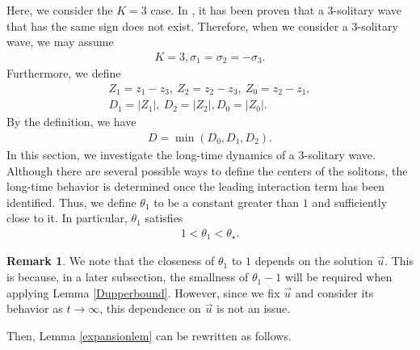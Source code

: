 \documentclass[reqno]{amsart}
\theoremstyle{plain}
\theoremstyle{definition}
\newtheorem{remark}{Remark}[section]
\numberwithin{equation}{section}
\newcommand{\1}{\mathbbm{1}}
\begin{document}
Here, we consider the $K=3$ case. In \cite{CD}, it has been proven that a 3-solitary wave that has the same sign does not exist. Therefore, when we consider a 3-solitary wave, we may assume
\begin{align}\label{3soliass}
K=3, \sigma_1=\sigma_2=-\sigma_3.
\end{align}
Furthermore, we define
\begin{align*}
Z_1=z_1-z_3,\ Z_2=z_2-z_3,\ Z_0=z_2-z_1,
\\
D_1=|Z_1|,\ D_2=|Z_2|, D_0=|Z_0|.
\end{align*}
By the definition, we have
\begin{align}\label{Ddef2}
D=\min{(D_0,D_1,D_2)}.
\end{align}
In this section, we investigate the long-time dynamics of a 3-solitary wave. Although there are several possible ways to define the centers of the solitons, the long-time behavior is determined once the leading interaction term has been identified. Thus, we define $\theta_1$ to be a constant greater than $1$ and sufficiently close to it. In particular, $\theta_1$ satisfies 
\begin{align}\label{theta1}
1<\theta_1<\theta_{\star}.
\end{align}
\begin{remark}
We note that the closeness of $\theta_1$ to $1$ depends on the solution $\vec{u}$. This is because, in a later subsection, the smallness of $\theta_1-1$ will be required when applying Lemma \ref{Dupperbound}. However, since we fix $\vec{u}$ and consider its behavior as $t\to\infty$, this dependence on $\vec{u}$ is not an issue.
\end{remark}






Then, Lemma \ref{expansionlem} can be rewritten as follows.
\end{document}
